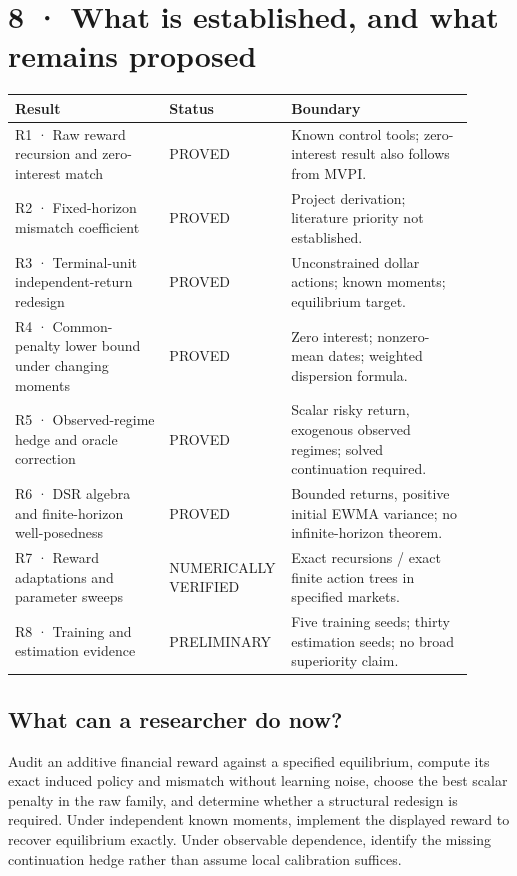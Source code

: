 \documentclass[10pt,a4paper]{article}
\begin{document}
\section*{8 · What is established, and what remains proposed}
\begin{longtable}{p{0.337\linewidth}p{0.182\linewidth}p{0.391\linewidth}}
\hline
\textbf{Result} & \textbf{Status} & \textbf{Boundary}\\\hline
R1 · Raw reward recursion and zero-interest match & PROVED & Known control tools; zero-interest result also follows from MVPI.\\\hline
R2 · Fixed-horizon mismatch coefficient & PROVED & Project derivation; literature priority not established.\\\hline
R3 · Terminal-unit independent-return redesign & PROVED & Unconstrained dollar actions; known moments; equilibrium target.\\\hline
R4 · Common-penalty lower bound under changing moments & PROVED & Zero interest; nonzero-mean dates; weighted dispersion formula.\\\hline
R5 · Observed-regime hedge and oracle correction & PROVED & Scalar risky return, exogenous observed regimes; solved continuation required.\\\hline
R6 · DSR algebra and finite-horizon well-posedness & PROVED & Bounded returns, positive initial EWMA variance; no infinite-horizon theorem.\\\hline
R7 · Reward adaptations and parameter sweeps & NUMERICALLY VERIFIED & Exact recursions / exact finite action trees in specified markets.\\\hline
R8 · Training and estimation evidence & PRELIMINARY & Five training seeds; thirty estimation seeds; no broad superiority claim.\\\hline
\end{longtable}
\subsection*{What can a researcher do now?}
Audit an additive financial reward against a specified equilibrium, compute its exact induced policy and mismatch without learning noise, choose the best scalar penalty in the raw family, and determine whether a structural redesign is required. Under independent known moments, implement the displayed reward to recover equilibrium exactly. Under observable dependence, identify the missing continuation hedge rather than assume local calibration suffices.
\end{document}
